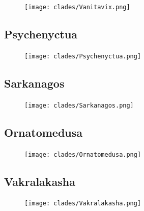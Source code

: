 \begin{figure}
	\centering
	\texttt{[image: clades/Vanitavix.png]}
\end{figure}

\lipsum[3]

\subsection{Psychenyctua}

\begin{figure}
	\centering
	\texttt{[image: clades/Psychenyctua.png]}
\end{figure}

\lipsum[4]

\subsection{Sarkanagos}

\begin{figure}
	\centering
	\texttt{[image: clades/Sarkanagos.png]}
\end{figure}

\lipsum[5]

\subsection{Ornatomedusa}

\begin{figure}
	\centering
	\texttt{[image: clades/Ornatomedusa.png]}
\end{figure}

\lipsum[6]

\subsection{Vakralakasha}

\begin{figure}
	\centering
	\texttt{[image: clades/Vakralakasha.png]}
\end{figure}

\lipsum[6]